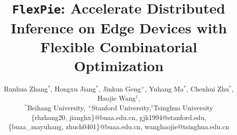\documentclass{llncs}
\newcommand{\sysname}[0]{\texttt{FlexPie}\xspace}
\begin{document}
\title{\sysname{}: Accelerate Distributed Inference on Edge Devices with Flexible Combinatorial Optimization}
\author{}\institute{}
\author{Runhua Zhang$^*$,
Hongxu Jiang\Letter$^*$,
Jinkun Geng$^+$,
Yuhang Ma$^*$,
Chenhui Zhu$^*$,
Haojie Wang$^\dagger$,\\
$^*$Beihang University, $^+$Stanford University,$^\dagger$Tsinghua University\\
\{rhzhang20, jianghx\}@buaa.edu.cn, gjk1994@stanford.edu,\\ 
\{buaa\_mayuhang, zhuch0401\}@buaa.edu.cn, wanghaojie@tsinghua.edu.cn
}

\maketitle            

\sloppypar




















\end{document}
